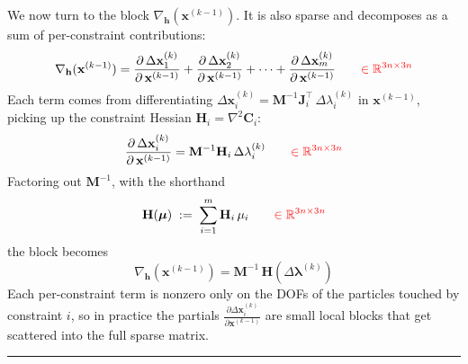 \documentclass{article}
\newcommand{\pd}[2]{\dfrac{\partial\, #1}{\partial\, #2}}
\newcommand{\pdc}[2]{\frac{\partial #1}{\partial #2}}
\newcommand{\red}[1]{\textcolor{red}{#1}}
\begin{document}
We now turn to the block $\nabla_\mathbf{h}(\mathbf{x}^{(k-1)})$. It is also sparse and decomposes as a sum of per-constraint contributions:
\begin{equation}
    \nabla_\mathbf{h}(\mathbf{x}^{(k-1)}) = 
    \pd{\Delta\mathbf{x}_1^{(k)}}{\mathbf{x}^{(k-1)}} + 
    \pd{\Delta\mathbf{x}_2^{(k)}}{\mathbf{x}^{(k-1)}} + 
    \cdots +
    \pd{\Delta\mathbf{x}_m^{(k)}}{\mathbf{x}^{(k-1)}}
    \qquad \red{\in \mathbb{R}^{3n \times 3n}}
\end{equation}
Each term comes from differentiating $\Delta\mathbf{x}_i^{(k)} = \mathbf{M}^{-1}\mathbf{J}_i^\top\,\Delta\lambda_i^{(k)}$ in $\mathbf{x}^{(k-1)}$, picking up the constraint Hessian $\mathbf{H}_i = \nabla^2 \mathbf{C}_i$:
\begin{equation}
    \pd{\Delta\mathbf{x}_i^{(k)}}{\mathbf{x}^{(k-1)}} = \mathbf{M}^{-1}\mathbf{H}_i\,\Delta\lambda_i^{(k)}
    \qquad \red{\in \mathbb{R}^{3n \times 3n}}
\end{equation}
Factoring out $\mathbf{M}^{-1}$, with the shorthand
\begin{equation*}
    \mathbf{H}(\boldsymbol{\mu}) \;:=\; \sum_{i=1}^{m} \mathbf{H}_i\,\mu_i 
    \qquad \red{\in \mathbb{R}^{3n \times 3n}}
\end{equation*}
the block becomes
\begin{equation}
    \nabla_\mathbf{h}(\mathbf{x}^{(k-1)}) = \mathbf{M}^{-1}\,\mathbf{H}(\Delta\boldsymbol{\lambda}^{(k)})
\end{equation}
Each per-constraint term is nonzero only on the DOFs of the particles touched by constraint $i$, so in practice the partials $\pdc{\Delta\mathbf{x}_i^{(k)}}{\mathbf{x}^{(k-1)}}$ are small local blocks that get scattered into the full sparse matrix.

\noindent\rule{\linewidth}{0.4pt}
\vspace{0.5ex}
\end{document}

